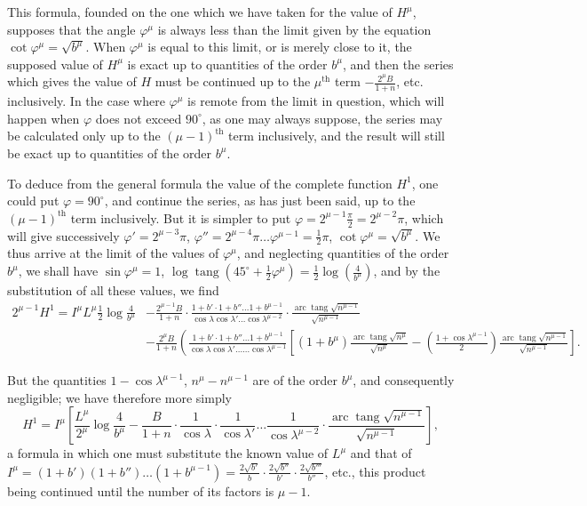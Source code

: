 \documentclass{article}
\begin{document}
This formula, founded on the one which we have taken for the value of $H^{\mu}$, supposes that the angle $\varphi^{\mu}$ is always less than the limit given by the equation $\cot\varphi^{\mu}=\sqrt{b^{\mu}}$. When $\varphi^{\mu}$ is equal to this limit, or is merely close to it, the supposed value of $H^{\mu}$ is exact up to quantities of the order $b^{\mu}$, and then the series which gives the value of $H$ must be continued up to the $\mu^{\text{th}}$ term $-\frac{2^{\mu}B}{1+n}$, etc. inclusively. In the case where $\varphi^{\mu}$ is remote from the limit in question, which will happen when $\varphi$ does not exceed $90^{\circ}$, as one may always suppose, the series may be calculated only up to the $(\mu-1)^{\text{th}}$ term inclusively, and the result will still be exact up to quantities of the order $b^{\mu}$.

To deduce from the general formula the value of the complete function $H^{1}$, one could put $\varphi=90^{\circ}$, and continue the series, as has just been said, up to the $(\mu-1)^{\text{th}}$ term inclusively. But it is simpler to put $\varphi=2^{\mu-1}\frac{\pi}{2}=2^{\mu-2}\pi$, which will give successively $\varphi'=2^{\mu-3}\pi$, $\varphi''=2^{\mu-4}\pi\ldots\varphi^{\mu-1}=\tfrac{1}{2}\pi$, $\cot\varphi^{\mu}=\sqrt{b^{\mu}}$. We thus arrive at the limit of the values of $\varphi^{\mu}$, and neglecting quantities of the order $b^{\mu}$, we shall have $\sin\varphi^{\mu}=1$, $\log\operatorname{tang}(45^{\circ}+\tfrac{1}{2}\varphi^{\mu})=\tfrac{1}{2}\log\left(\frac{4}{b^{\mu}}\right)$, and by the substitution of all these values, we find
\[ \begin{aligned} 2^{\mu-1}H^{1}=I^{\mu}L^{\mu}\tfrac{1}{2}\log\frac{4}{b^{\mu}}&-\frac{2^{\mu-1}B}{1+n}\cdot\frac{1+b'\cdot 1+b''\ldots 1+b^{\mu-1}}{\cos\lambda\cos\lambda'\ldots\cos\lambda^{\mu-2}}\cdot\frac{\operatorname{arc}\operatorname{tang}\sqrt{n^{\mu-1}}}{\sqrt{n^{\mu-1}}}\\ &-\frac{2^{\mu}B}{1+n}\left(\frac{1+b'\cdot 1+b''\ldots 1+b^{\mu-1}}{\cos\lambda\cos\lambda'\ldots\ldots\cos\lambda^{\mu-1}}\left[(1+b^{\mu})\frac{\operatorname{arc}\operatorname{tang}\sqrt{n^{\mu}}}{\sqrt{n^{\mu}}}-\left(\frac{1+\cos\lambda^{\mu-1}}{2}\right)\frac{\operatorname{arc}\operatorname{tang}\sqrt{n^{\mu-1}}}{\sqrt{n^{\mu-1}}}\right]. \right. \end{aligned} \]

But the quantities $1-\cos\lambda^{\mu-1}$, $n^{\mu}-n^{\mu-1}$ are of the order $b^{\mu}$, and consequently negligible; we have therefore more simply
\[ H^{1}=I^{\mu}\left[\frac{L^{\mu}}{2^{\mu}}\log\frac{4}{b^{\mu}}-\frac{B}{1+n}\cdot\frac{1}{\cos\lambda}\cdot\frac{1}{\cos\lambda'}\ldots\frac{1}{\cos\lambda^{\mu-2}}\cdot\frac{\operatorname{arc}\operatorname{tang}\sqrt{n^{\mu-1}}}{\sqrt{n^{\mu-1}}}\right], \]
a formula in which one must substitute the known value of $L^{\mu}$ and that of $I^{\mu}=(1+b')(1+b'')\ldots(1+b^{\mu-1})=\frac{2\sqrt{b'}}{b}\cdot\frac{2\sqrt{b''}}{b'}\cdot\frac{2\sqrt{b'''}}{b''}$, etc., this product being continued until the number of its factors is $\mu-1$.
\end{document}
